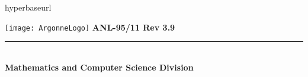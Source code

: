 %
%

hyperbaseurl

\makeindex

\def\design{\medskip \noindent Design Issue:\begin{em}}
\def\enddesign{\end{em} \medskip}


\def\shortintro{false}

\usepackage{fancyhdr,lastpage}
\pagestyle{fancy}





\pagestyle{empty}
\hspace{-.65in}\texttt{[image: ArgonneLogo]}
\hfill  {\large {\bf ANL-95/11 Rev 3.9}}

\vspace*{2in}
\vspace*{8pt}
\hrule
\vspace*{8pt}

\vspace*{1in}
\noindent \\
{\Large {\bf Mathematics and Computer Science Division}}

\vspace*{10pt}


\vspace*{20pt}



